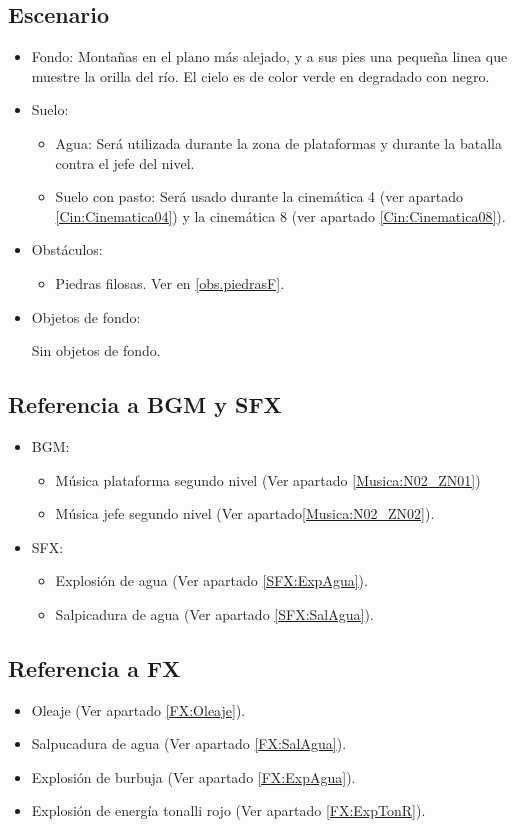 \subsection{Escenario}
\begin{itemize} 
	\item Fondo:
Montañas en el plano más alejado, y a sus pies una pequeña linea que muestre la orilla del río. El cielo es de color verde en degradado con negro.
	\item Suelo:
		\begin{itemize}
			\item Agua: Será utilizada durante la zona de plataformas y durante la batalla contra el jefe del nivel.
			\item Suelo con pasto: Será usado durante la cinemática 4 (ver apartado \ref{Cin:Cinematica04}) y la cinemática 8 (ver apartado \ref{Cin:Cinematica08}).
		\end{itemize}
	\item Obstáculos:
		\begin{itemize}
			\item Piedras filosas. Ver en \ref{obs.piedrasF}.				
		\end{itemize}
	\item Objetos de fondo: 
	\\
	\par	
	Sin objetos de fondo.
	
\end{itemize}	
	
	\subsection{Referencia a BGM y SFX}
\begin{itemize}
	\item BGM:
		\begin{itemize}
			\item Música plataforma segundo nivel (Ver apartado \ref{Musica:N02_ZN01})
			\item Música jefe segundo nivel (Ver apartado\ref{Musica:N02_ZN02}).
		\end{itemize}
	\item SFX:
		\begin{itemize}
			\item Explosión de agua (Ver apartado \ref{SFX:ExpAgua}).
			\item Salpicadura de agua (Ver apartado \ref{SFX:SalAgua}).
		\end{itemize}
\end{itemize}
	\subsection{Referencia a FX}
\begin{itemize}
	\item Oleaje (Ver apartado \ref{FX:Oleaje}).
	\item Salpucadura de agua (Ver apartado \ref{FX:SalAgua}).
	\item Explosión de burbuja (Ver apartado \ref{FX:ExpAgua}).
	\item Explosión de energía tonalli rojo (Ver apartado \ref{FX:ExpTonR}).
		 
\end{itemize}
